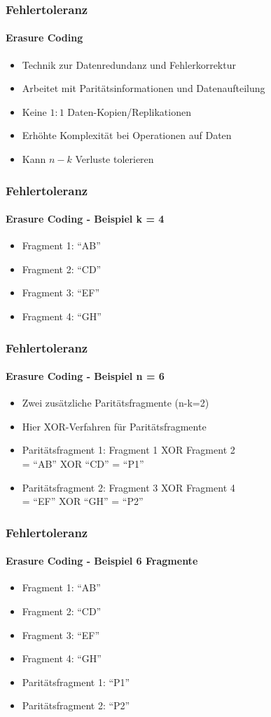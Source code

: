 \begin{frame}
  \frametitle{Fehlertoleranz}
  \framesubtitle{Erasure Coding}
 \begin{itemize}
    \item Technik zur Datenredundanz und Fehlerkorrektur
    \item Arbeitet mit Paritätsinformationen und Datenaufteilung
    \item Keine $1:1$ Daten-Kopien/Replikationen
    \item Erhöhte Komplexität bei Operationen auf Daten
    \item Kann $n-k$ Verluste tolerieren
  \end{itemize}    
\end{frame}

\begin{frame}
  \frametitle{Fehlertoleranz}
  \framesubtitle{Erasure Coding - Beispiel k = 4}
   \begin{itemize}
  \item Fragment 1: \enquote{AB}
  \item Fragment 2: \enquote{CD}
  \item Fragment 3: \enquote{EF}
  \item Fragment 4: \enquote{GH}
  \end{itemize}
\end{frame}

\begin{frame}
  \frametitle{Fehlertoleranz}
  \framesubtitle{Erasure Coding - Beispiel n = 6}
   \begin{itemize}
  \item Zwei zusätzliche Paritätsfragmente (n-k=2)
  \item Hier XOR-Verfahren für Paritätsfragmente
  \end{itemize}
  \begin{itemize}
  \item Paritätsfragment 1: Fragment 1 XOR Fragment 2\\ = \enquote{AB} XOR \enquote{CD} = \enquote{P1}
  \item Paritätsfragment 2: Fragment 3 XOR Fragment 4\\ = \enquote{EF} XOR \enquote{GH} = \enquote{P2}
  \end{itemize}
\end{frame}

\begin{frame}
  \frametitle{Fehlertoleranz}
  \framesubtitle{Erasure Coding - Beispiel 6 Fragmente}
  \begin{itemize}
  \item Fragment 1: \enquote{AB}
  \item Fragment 2: \enquote{CD}
  \item Fragment 3: \enquote{EF}
  \item Fragment 4: \enquote{GH}
  \item Paritätsfragment 1: \enquote{P1}
  \item Paritätsfragment 2: \enquote{P2}
  \end{itemize}  
\end{frame}

